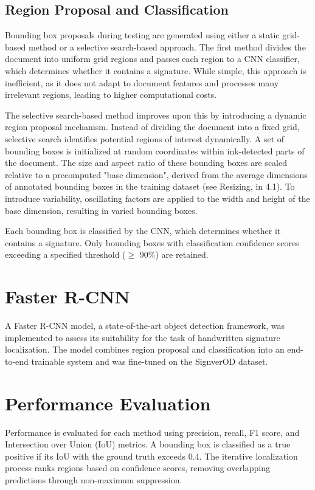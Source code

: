 \documentclass[a4paper,12pt]{article}
\begin{document}
\subsection{Region Proposal and Classification}
Bounding box proposals during testing are generated using either a static grid-based method or a selective search-based approach. The first method divides the document into uniform grid regions and passes each region to a CNN classifier, which determines whether it contains a signature. While simple, this approach is inefficient, as it does not adapt to document features and processes many irrelevant regions, leading to higher computational costs.

The selective search-based method improves upon this by introducing a dynamic region proposal mechanism. Instead of dividing the document into a fixed grid, selective search identifies potential regions of interest dynamically. A set of bounding boxes is initialized at random coordinates within ink-detected parts of the document. The size and aspect ratio of these bounding boxes are scaled relative to a precomputed "base dimension", derived from the average dimensions of annotated bounding boxes in the training dataset (see Resizing, in 4.1). To introduce variability, oscillating factors are applied to the width and height of the base dimension, resulting in varied bounding boxes. 

Each bounding box is classified by the CNN, which determines whether it contains a signature. Only bounding boxes with classification confidence scores exceeding a specified threshold ($\ge$ 90\%) are retained.


\section{Faster R-CNN}
A Faster R-CNN model, a state-of-the-art object detection framework, was implemented to assess its suitability for the task of handwritten signature localization. The model combines region proposal and classification into an end-to-end trainable system and was fine-tuned on the SignverOD dataset.

\section{Performance Evaluation}
Performance is evaluated for each method using precision, recall, F1 score, and Intersection over Union (IoU) metrics. A bounding box is classified as a true positive if its IoU with the ground truth exceeds 0.4. The iterative localization process ranks regions based on confidence scores, removing overlapping predictions through non-maximum suppression.
\end{document}
